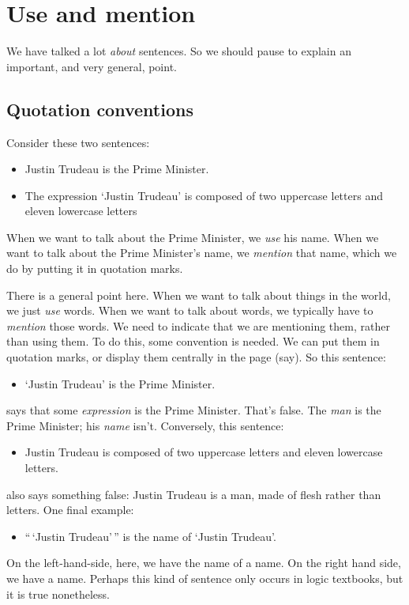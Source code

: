 \chapter{Use and mention}\label{s:UseMention}
We have talked a lot \emph{about} sentences. So we should pause to explain an important, and very general, point.

\section{Quotation conventions}
Consider these two sentences:
	\begin{itemize}
		\item Justin Trudeau is the Prime Minister.
		\item The expression `Justin Trudeau' is composed of two uppercase letters and eleven lowercase letters
	\end{itemize}
When we want to talk about the Prime Minister, we \emph{use} his name. When we want to talk about the Prime Minister's name, we \emph{mention} that name, which we do by putting it in quotation marks.

There is a general point here. When we want to talk about things in the world, we just \emph{use} words. When we want to talk about words, we typically have to \emph{mention} those words. We need to indicate that we are mentioning them, rather than using them. To do this, some convention is needed. We can put them in quotation marks, or display them centrally in the page (say). So this sentence:
	\begin{itemize}
		\item `Justin Trudeau' is the Prime Minister.
	\end{itemize}
says that some \emph{expression} is the Prime Minister. That's false. The \emph{man} is the Prime Minister; his \emph{name} isn't. Conversely, this sentence:
	\begin{itemize}
		\item Justin Trudeau is composed of two uppercase letters and eleven lowercase letters.
	\end{itemize}
also says something false: Justin Trudeau is a man, made of flesh rather than letters. One final example:
	\begin{itemize}
		\item ``\,`Justin Trudeau'\,'' is the name of `Justin Trudeau'.
	\end{itemize} 
On the left-hand-side, here, we have the name of a name. On the right hand side, we have a name. Perhaps this kind of sentence only occurs in logic textbooks, but it is true nonetheless.


